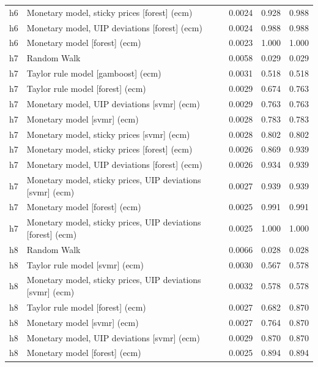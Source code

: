 \begin{ThreePartTable}
\begin{longtable}[t]{cp{5.5cm}ccc}
h6 & \raggedright Monetary model, sticky prices [forest] (ecm) & 0.0024 & 0.928 & 0.988\\
h6 & \raggedright Monetary model, UIP deviations [forest] (ecm) & 0.0024 & 0.988 & 0.988\\
h6 & \raggedright Monetary model [forest] (ecm) & 0.0023 & 1.000 & 1.000\\
\addlinespace
h7 & \raggedright Random Walk & 0.0058 & 0.029 & 0.029\\
h7 & \raggedright Taylor rule model [gamboost] (ecm) & 0.0031 & 0.518 & 0.518\\
h7 & \raggedright Taylor rule model [forest] (ecm) & 0.0029 & 0.674 & 0.763\\
h7 & \raggedright Monetary model, UIP deviations [svmr] (ecm) & 0.0029 & 0.763 & 0.763\\
h7 & \raggedright Monetary model [svmr] (ecm) & 0.0028 & 0.783 & 0.783\\
h7 & \raggedright Monetary model, sticky prices [svmr] (ecm) & 0.0028 & 0.802 & 0.802\\
h7 & \raggedright Monetary model, sticky prices [forest] (ecm) & 0.0026 & 0.869 & 0.939\\
h7 & \raggedright Monetary model, UIP deviations [forest] (ecm) & 0.0026 & 0.934 & 0.939\\
h7 & \raggedright Monetary model, sticky prices, UIP deviations [svmr] (ecm) & 0.0027 & 0.939 & 0.939\\
h7 & \raggedright Monetary model [forest] (ecm) & 0.0025 & 0.991 & 0.991\\
h7 & \raggedright Monetary model, sticky prices, UIP deviations [forest] (ecm) & 0.0025 & 1.000 & 1.000\\
\addlinespace
h8 & \raggedright Random Walk & 0.0066 & 0.028 & 0.028\\
h8 & \raggedright Taylor rule model [svmr] (ecm) & 0.0030 & 0.567 & 0.578\\
h8 & \raggedright Monetary model, sticky prices, UIP deviations [svmr] (ecm) & 0.0032 & 0.578 & 0.578\\
h8 & \raggedright Taylor rule model [forest] (ecm) & 0.0027 & 0.682 & 0.870\\
h8 & \raggedright Monetary model [svmr] (ecm) & 0.0027 & 0.764 & 0.870\\
h8 & \raggedright Monetary model, UIP deviations [svmr] (ecm) & 0.0029 & 0.870 & 0.870\\
h8 & \raggedright Monetary model [forest] (ecm) & 0.0025 & 0.894 & 0.894\\

\end{longtable}
\end{ThreePartTable}
